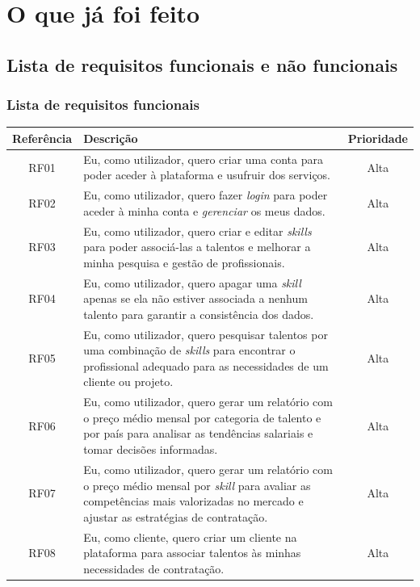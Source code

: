 \section{O que já foi feito}

\subsection{Lista de requisitos funcionais e não funcionais}
\subsubsection{Lista de requisitos funcionais}
\renewcommand{\arraystretch}{1.3}
\begin{center} %
\begin{longtable}{|c|p{9cm}|c|} %
    \hline
    \textbf{Referência} & \textbf{Descrição} & \textbf{Prioridade} \\
    \hline
    RF01 & Eu, como utilizador, quero criar uma conta para poder aceder à plataforma e usufruir dos serviços. & Alta \\
    \hline
    RF02 & Eu, como utilizador, quero fazer \textit{login} para poder aceder à minha conta e \textit{gerenciar} os meus dados. & Alta \\
    \hline
    RF03 & Eu, como utilizador, quero criar e editar \textit{skills} para poder associá-las a talentos e melhorar a minha pesquisa e gestão de profissionais. & Alta \\
    \hline
    RF04 & Eu, como utilizador, quero apagar uma \textit{skill} apenas se ela não estiver associada a nenhum talento para garantir a consistência dos dados. & Alta \\
    \hline
    RF05 & Eu, como utilizador, quero pesquisar talentos por uma combinação de \textit{skills} para encontrar o profissional adequado para as necessidades de um cliente ou projeto. & Alta \\
    \hline
    RF06 & Eu, como utilizador, quero gerar um relatório com o preço médio mensal por categoria de talento e por país para analisar as tendências salariais e tomar decisões informadas. & Alta \\
    \hline
    RF07 & Eu, como utilizador, quero gerar um relatório com o preço médio mensal por \textit{skill} para avaliar as competências mais valorizadas no mercado e ajustar as estratégias de contratação. & Alta \\
    \hline
    RF08 & Eu, como cliente, quero criar um cliente na plataforma para associar talentos às minhas necessidades de contratação. & Alta \\

\end{longtable}
\end{center}
